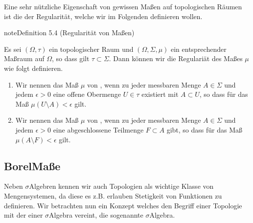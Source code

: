 \documentclass[letterpaper,10pt,german]{jupyterBook}
\begin{document}
\sphinxAtStartPar
Eine sehr nützliche Eigenschaft von gewissen Maßen auf topologischen Räumen ist die der Regularität, welche wir im Folgenden definieren wollen.
\label{masstheorie/masstheorie:def:regularitaet}
\begin{sphinxadmonition}{note}{Definition 5.4 (Regularität von Maßen)}



\sphinxAtStartPar
Es sei \((\Omega, \tau)\) ein topologischer Raum und \((\Omega, \Sigma, \mu)\) ein entsprechender Maßraum auf \(\Omega\), so dass gilt \(\tau \subset \Sigma\).
Dann können wir die Regulariät des Maßes \(\mu\) wie folgt definieren.
\begin{enumerate}
%
\item {} 
\sphinxAtStartPar
Wir nennen das Maß \(\mu\) von , wenn zu jeder messbaren Menge \(A \in \Sigma\) und jedem \(\epsilon > 0\) eine offene Obermenge \(U \in \tau\) existiert mit \(A \subset U\), so dass für das Maß \(\mu(U\setminus A) < \epsilon\) gilt.

\item {} 
\sphinxAtStartPar
Wir nennen das Maß \(\mu\) von , wenn zu jeder messbaren Menge \(A \in \Sigma\) und jedem \(\epsilon > 0\) eine abgeschlossene Teilmenge \(F \subset A\) gibt, so dass für das Maß \(\mu(A\setminus F) < \epsilon\) gilt.

\end{enumerate}
\end{sphinxadmonition}


\subsection{Borel\sphinxhyphen{}Maße}
\label{\detokenize{masstheorie/masstheorie:borel-masze}}
\sphinxAtStartPar
Neben \(\sigma\)\sphinxhyphen{}Algebren kennen wir auch Topologien als wichtige Klasse von Mengensystemen, da diese es z.B. erlauben Stetigkeit von Funktionen zu definieren. Wir betrachten nun ein Konzept welches den Begriff einer Topologie mit der einer \(\sigma\)\sphinxhyphen{}Algebra vereint, die sogenannte \sphinxhyphen{}\(\sigma\)\sphinxhyphen{}Algebra.
\end{document}
